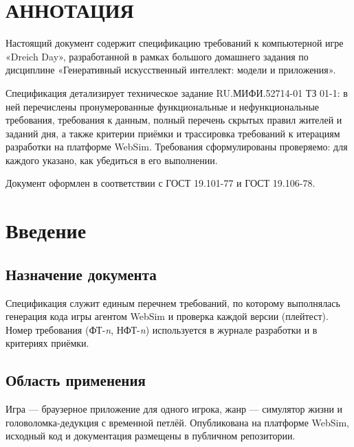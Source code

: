 \documentclass[12pt]{article}
\begin{document}

\section*{\centering АННОТАЦИЯ}
Настоящий документ содержит спецификацию требований к компьютерной игре «Dreich Day», разработанной в рамках большого домашнего задания по дисциплине «Генеративный искусственный интеллект: модели и приложения».

Спецификация детализирует техническое задание RU.МИФИ.52714-01 ТЗ 01-1: в ней перечислены пронумерованные функциональные и нефункциональные требования, требования к данным, полный перечень скрытых правил жителей и заданий дня, а также критерии приёмки и трассировка требований к итерациям разработки на платформе WebSim. Требования сформулированы проверяемо: для каждого указано, как убедиться в его выполнении.

Документ оформлен в соответствии с ГОСТ 19.101-77 и ГОСТ 19.106-78.
\clearpage
\tableofcontents
\clearpage

\section{Введение}
\subsection{Назначение документа}
Спецификация служит единым перечнем требований, по которому выполнялась генерация кода игры агентом WebSim и проверка каждой версии (плейтест). Номер требования (ФТ-\textit{n}, НФТ-\textit{n}) используется в журнале разработки и в критериях приёмки.

\subsection{Область применения}
Игра — браузерное приложение для одного игрока, жанр — симулятор жизни и головоломка-дедукция с временной петлёй. Опубликована на платформе WebSim, исходный код и документация размещены в публичном репозитории.
\end{document}
